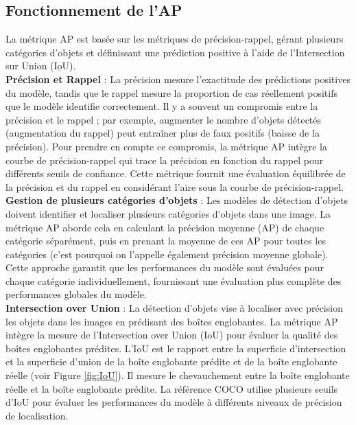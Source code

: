 \documentclass{article}
\begin{document}
\subsection{Fonctionnement de l'AP}
La métrique AP est basée sur les métriques de précision-rappel, gérant plusieurs catégories d'objets et définissant une prédiction positive à l'aide de l'Intersection sur Union (IoU).
\vspace{0.2cm}\\
\textbf{Précision et Rappel} : La précision mesure l'exactitude des prédictions positives du modèle, tandis que le rappel mesure la proportion de cas réellement positifs que le modèle identifie correctement. Il y a souvent un compromis entre la précision et le rappel ; par exemple, augmenter le nombre d'objets détectés (augmentation du rappel) peut entraîner plus de faux positifs (baisse de la précision). Pour prendre en compte ce compromis, la métrique AP intègre la courbe de précision-rappel qui trace la précision en fonction du rappel pour différents seuils de confiance. Cette métrique fournit une évaluation équilibrée de la précision et du rappel en considérant l'aire sous la courbe de précision-rappel.
\vspace{0.2cm}\\
\textbf{Gestion de plusieurs catégories d'objets} : Les modèles de détection d'objets doivent identifier et localiser plusieurs catégories d'objets dans une image. La métrique AP aborde cela en calculant la précision moyenne (AP) de chaque catégorie séparément, puis en prenant la moyenne de ces AP pour toutes les catégories (c'est pourquoi on l'appelle également précision moyenne globale). Cette approche garantit que les performances du modèle sont évaluées pour chaque catégorie individuellement, fournissant une évaluation plus complète des performances globales du modèle.
\vspace{0.2cm}\\
\textbf{Intersection over Union} : La détection d'objets vise à localiser avec précision les objets dans les images en prédisant des boîtes englobantes. La métrique AP intègre la mesure de l'Intersection over Union (IoU) pour évaluer la qualité des boîtes englobantes prédites. L'IoU est le rapport entre la superficie d'intersection et la superficie d'union de la boîte englobante prédite et de la boîte englobante réelle (voir Figure \ref{fig:IoU}). Il mesure le chevauchement entre la boîte englobante réelle et la boîte englobante prédite. La référence COCO utilise plusieurs seuils d'IoU pour évaluer les performances du modèle à différents niveaux de précision de localisation.
\end{document}
